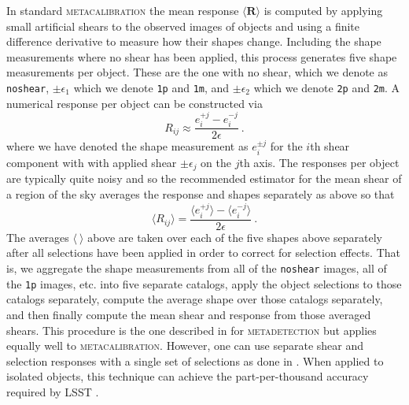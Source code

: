 \documentclass[twocolumn]{openjournal}
\makeatletter
\newcommand{\mdet}{\textsc{metadetection}\@\xspace}
\newcommand{\mcal}{\textsc{metacalibration}\@\xspace}
\newcommand{\noshear}{\texttt{noshear}\@\xspace}
\makeatother
\begin{document}
In standard \mcal the mean response $\langle \mathbf{R} \rangle$ is computed by applying
small artificial shears to the observed images of objects and using a finite difference
derivative to measure how their shapes change. Including the shape measurements where no
shear has been applied, this process generates five shape measurements per object. These
are the one with no shear, which we denote as \texttt{noshear},
$\pm\epsilon_1$ which we denote \texttt{1p} and \texttt{1m}, and
$\pm\epsilon_2$ which we denote \texttt{2p} and \texttt{2m}.
A numerical response per object can be constructed via
\begin{equation*}
R_{ij} \approx \frac{e_i^{+j} - e_i^{-j}}{2\epsilon}\ .
\end{equation*}
where we have denoted the shape measurement as $e_i^{\pm j}$ for the $i$th shear
component with  with applied shear $\pm\epsilon_j$ on the $j$th axis. The responses per
object are typically quite noisy and so the recommended estimator for the mean shear of
a region of the sky averages the response and shapes separately as above so that
\begin{equation*}
\langle R_{ij} \rangle = \frac{\langle e_i^{+j} \rangle - \langle e_i^{-j} \rangle}{2\epsilon}\ .
\end{equation*}
The averages $\langle\ \rangle$ above are taken over each of the five shapes above
separately after all selections have been applied in order to correct for selection
effects. That is, we aggregate the shape measurements from all of the \noshear images,
all of the \texttt{1p} images, etc. into five separate catalogs, apply the object
selections to those catalogs separately, compute the average shape over those catalogs
separately, and then finally compute the mean shear and response from those averaged
shears. This procedure is the one described in \citet{SheldonMdet2020} for \mdet but
applies equally well to \mcal. However, one can use separate shear and selection
responses with a single set of selections as done in \citet{SheldonMcal2017}. When
applied to isolated objects, this technique can achieve the part-per-thousand accuracy
required by LSST \citep{HuffMcal2017,SheldonMcal2017}.
\end{document}
